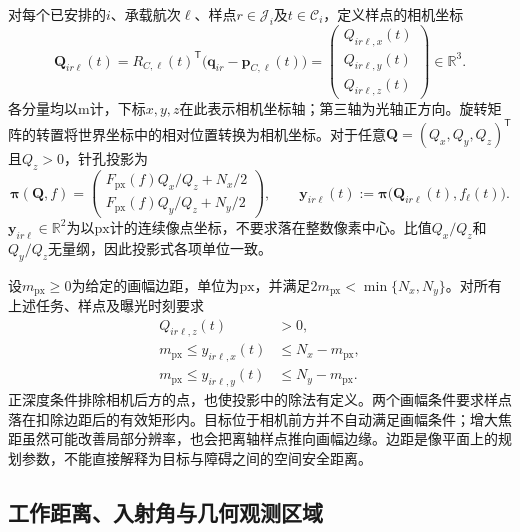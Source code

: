 对每个已安排的$i$、承载航次$\ell$、样点$r\in\mathcal J_i$及$t\in\mathcal C_i$，定义样点的相机坐标
\begin{equation}
 \mathbf Q_{ir\ell}(t)
 =R_{C,\ell}(t)^{\mathsf T}
   \bigl(\mathbf q_{ir}-\mathbf p_{C,\ell}(t)\bigr)
 =\begin{pmatrix}Q_{ir\ell,x}(t)\\Q_{ir\ell,y}(t)\\Q_{ir\ell,z}(t)\end{pmatrix}
 \in\mathbb R^3.
 \label{s0405:camera_point}
\end{equation}
各分量均以$\mathrm m$计，下标$x,y,z$在此表示相机坐标轴；第三轴为光轴正方向。旋转矩阵的转置将世界坐标中的相对位置转换为相机坐标。对于任意$\mathbf Q=(Q_x,Q_y,Q_z)^{\mathsf T}$且$Q_z>0$，针孔投影为
\begin{equation}
 \boldsymbol\pi(\mathbf Q,f)
 =\begin{pmatrix}
 F_{\mathrm{px}}(f)Q_x/Q_z+N_x/2\\
 F_{\mathrm{px}}(f)Q_y/Q_z+N_y/2
 \end{pmatrix},
 \qquad
 \mathbf y_{ir\ell}(t)
 :=\boldsymbol\pi\bigl(\mathbf Q_{ir\ell}(t),f_\ell(t)\bigr).
 \label{s0405:pinhole_projection}
\end{equation}
$\mathbf y_{ir\ell}\in\mathbb R^2$为以$\mathrm{px}$计的连续像点坐标，不要求落在整数像素中心。比值$Q_x/Q_z$和$Q_y/Q_z$无量纲，因此投影式各项单位一致。

设$m_{\mathrm{px}}\ge0$为给定的画幅边距，单位为$\mathrm{px}$，并满足$2m_{\mathrm{px}}<\min\{N_x,N_y\}$。对所有上述任务、样点及曝光时刻要求
\begin{subequations}
\label{s0405:frame_constraints}
\begin{align}
 Q_{ir\ell,z}(t)&>0,
 \label{s0405:positive_depth}\\
 m_{\mathrm{px}}\le y_{ir\ell,x}(t)&\le N_x-m_{\mathrm{px}},
 \label{s0405:horizontal_frame}\\
 m_{\mathrm{px}}\le y_{ir\ell,y}(t)&\le N_y-m_{\mathrm{px}}.
 \label{s0405:vertical_frame}
\end{align}
\end{subequations}
正深度条件排除相机后方的点，也使投影中的除法有定义。两个画幅条件要求样点落在扣除边距后的有效矩形内。目标位于相机前方并不自动满足画幅条件；增大焦距虽然可能改善局部分辨率，也会把离轴样点推向画幅边缘。边距是像平面上的规划参数，不能直接解释为目标与障碍之间的空间安全距离。

\subsection{工作距离、入射角与几何观测区域}

